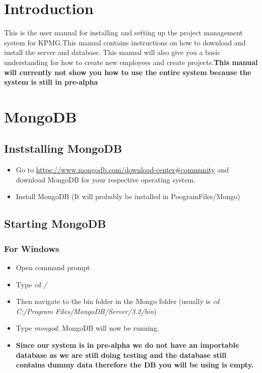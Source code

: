 \documentclass[a4paper,12pt]{article}
\begin{document}
\section{Introduction}
	This is the user manual for installing and setting up the project management system for KPMG.This manual contains instructions on how to download and install the server and database. This manual will also give you a basic understanding for how to create new employees and create projects.\linebreak\linebreak\textbf{This manual will currently not show you how to use the entire system because the system is still in pre-alpha}
\section{MongoDB}
\subsection{Inststalling MongoDB}
	\begin{itemize}
		\item Go to \url{ https://www.mongodb.com/download-center#community} and download MongoDB for your respective operating system.
		\item Install MongoDB (It will probably be installed in PoogramFiles/Mongo)
	\end{itemize}
\subsection{Starting MongoDB}
	\subsubsection{For Windows}
		\begin{itemize}
			\item Open command prompt
			\item Type \textit{cd /}
			\item Then navigate to the bin folder in the Mongo folder \linebreak (usually is \textit{cd C:/Program Files/MongoDB/Server/3.2/bin})
			\item Type \textit{mongod}. MongoDB will now be running.
			\item \textbf{Since our system is in pre-alpha we do not have an importable database as we are still doing testing and the database still contains dummy data therefore the DB you will be using is empty.}
		\end{itemize}
	
\end{document}
